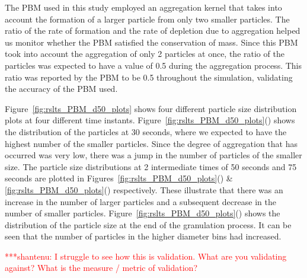 \documentclass[preprint,11pt,authoryear]{elsarticle}
\newcommand{\jhanote}[1]{ {\textcolor{red} { ***shantenu: #1 }}}
\newcommand{\jhanote}[1]{ {\textcolor{red} { ***shantenu: #1 }}}
\begin{document}
The PBM used in this study employed an aggregation kernel that takes into
account the formation of a larger particle from only two smaller particles.
The ratio of the rate of formation and the rate of depletion due to
aggregation helped us monitor whether the PBM satisfied the conservation of
mass. Since this PBM took into account the aggregation of only 2 particles at
once, the ratio of the particles was expected to have a value of 0.5 during
the aggregation process. This ratio was reported by the PBM to be 0.5
throughout the simulation, validating the accuracy of the PBM used.

Figure~\ref{fig:rslts_PBM_d50_plots} shows four different particle size
distribution plots at four different time instants.
Figure~\ref{fig:rslts_PBM_d50_plots}() shows the distribution
of the particles at 30 seconds, where we expected to have the highest number
of the smaller particles. Since the degree of aggregation that has occurred
was very low, there was a jump in the number of particles of the smaller size.
The particle size distributions at 2 intermediate times of 50 seconds and 75
seconds are plotted in Figures~\ref{fig:rslts_PBM_d50_plots}()
\& \ref{fig:rslts_PBM_d50_plots}() respectively. These
illustrate that there was an increase in the number of larger particles  and a
subsequent decrease in the number of smaller particles.
Figure~\ref{fig:rslts_PBM_d50_plots}() shows the distribution
of the particle size at the end of the granulation process. It can be seen
that the number of particles in the higher diameter bins had increased.

\jhanote{I struggle to see how this is validation. What are you validating
against? What is the measure / metric of validation?}
\end{document}
